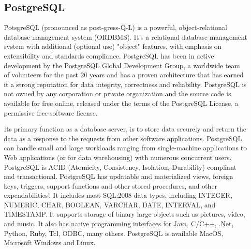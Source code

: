 \subsection{PostgreSQL}
PotsgreSQL (pronounced as post-gress-Q-L) is a powerful, object-relational database management system (ORDBMS). It's a relational database management system with additional (optional use) "object" features, with emphasis on extensibility and standards compliance. 
PostgreSQL has been in active development by the PostgreSQL Global Development Group, a worldwide team of volunteers for the past 20 years 
and has a proven architecture that has earned it a strong reputation for data integrity, correctness and reliability. PostgreSQL is not owned by any corporation or private organization and the source code is available for free online, released under the terms of the PostgreSQL 
License, a permissive free-software license\cite{PostgreSQL}\cite{PostgreContributors}. \par
Its primary function as a database server, is to store data securely and return the data as a response to the requests from other software applications. PostgreSQL can handle small and large workloads ranging from single-machine applications to Web applications (or for data warehousing) with numerous concurrent users. PostgreSQL is ACID (Atomicity, Consistency, Isolation, Durability) compliant and transactional. PostgreSQL has updatable and materialized views, foreign keys, triggers, support functions and
other stored procedures, and other expendabilities’. It includes most SQL:2008 data types, including INTEGER, NUMERIC, CHAR, BOOLEAN, VARCHAR, DATE, INTERVAL, and TIMESTAMP. It supports storage of binary large objects such as pictures, video, and music. It also has native programming interfaces for Java, C/C++, .Net, Python, Ruby, Tcl, ODBC, many others\cite{PostgreAbout}. PostgreSQL is available MacOS, Microsoft Windows and Linux.

